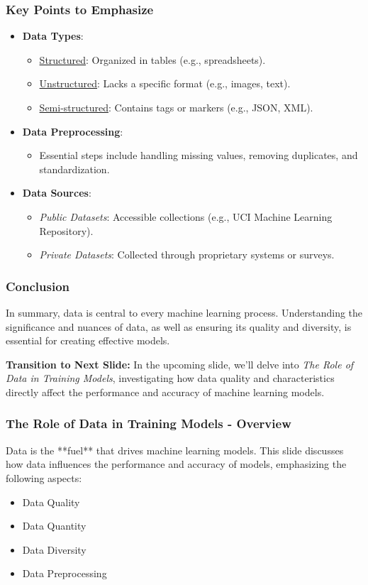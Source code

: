 \documentclass[aspectratio=169]{beamer}
\begin{document}
\begin{frame}[fragile]
    \frametitle{Key Points to Emphasize}
    \begin{itemize}
        \item \textbf{Data Types}:
        \begin{itemize}
            \item \underline{Structured}: Organized in tables (e.g., spreadsheets).
            \item \underline{Unstructured}: Lacks a specific format (e.g., images, text).
            \item \underline{Semi-structured}: Contains tags or markers (e.g., JSON, XML).
        \end{itemize}
        
        \item \textbf{Data Preprocessing}:
        \begin{itemize}
            \item Essential steps include handling missing values, removing duplicates, and standardization.
        \end{itemize}
        
        \item \textbf{Data Sources}:
        \begin{itemize}
            \item \textit{Public Datasets}: Accessible collections (e.g., UCI Machine Learning Repository).
            \item \textit{Private Datasets}: Collected through proprietary systems or surveys.
        \end{itemize}
    \end{itemize}
\end{frame}

\begin{frame}[fragile]
    \frametitle{Conclusion}
    In summary, data is central to every machine learning process. Understanding the significance and nuances of data, as well as ensuring its quality and diversity, is essential for creating effective models. 

    \textbf{Transition to Next Slide:} 
    In the upcoming slide, we'll delve into \textit{The Role of Data in Training Models}, investigating how data quality and characteristics directly affect the performance and accuracy of machine learning models.
\end{frame}

\begin{frame}[fragile]
    \frametitle{The Role of Data in Training Models - Overview}
    Data is the **fuel** that drives machine learning models. This slide discusses how data influences the performance and accuracy of models, emphasizing the following aspects:
    \begin{itemize}
        \item Data Quality
        \item Data Quantity
        \item Data Diversity
        \item Data Preprocessing
    \end{itemize}
\end{frame}
\end{document}
